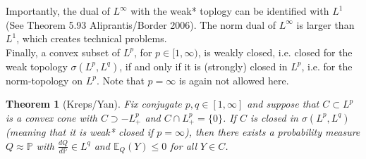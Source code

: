 \documentclass[12pt,a4paper, twoside]{article}
\newtheorem{thm}{Theorem}[section]
\theoremstyle{definition}
\newcommand{\EE}{\mathbb{E}} %
\newcommand{\PP}{\mathbb{P}} %
\begin{document}
\\\\
Importantly, the dual of $L^\infty$ with the weak* toplogy can be identified with $L^1$ (See Theorem 5.93 Aliprantis/Border 2006). The norm dual of $L^\infty$ is larger than $L^1$, which creates technical problems.
\\
Finally, a convex subset of $L^p$, for $p \in [1, \infty)$,  is weakly closed, i.e. closed for the weak topology $\sigma( L^p, L^q)$, if and only if it is (strongly) closed in $L^p$, i.e. for the norm-topology on $L^p$. Note that $p= \infty$ is again not allowed here. 
\newpage
\begin{thm}[Kreps/Yan] Fix conjugate $p,q \in [1, \infty]$ and suppose that $C \subset L^p$ is a convex cone with $C \supset -L_+^p$ and $C \cap L_+^p= \{0 \}$. If $C$ is closed in $\sigma(L^p, L^q)$ (meaning that it is weak* closed if $p= \infty$), then there exists a probability measure $Q \approx \PP$ with $\frac{dQ}{d \PP} \in L^q$ and $\EE_Q(Y) \leq 0$ for all $Y \in C$. 
\end{thm}
\end{document}
